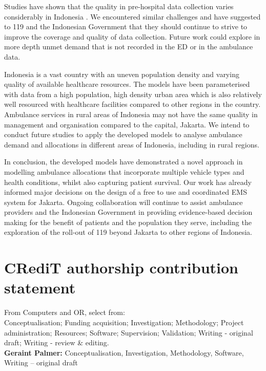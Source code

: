 \documentclass[preprint,12pt]{elsarticle}
\begin{document}
Studies have shown that the quality in pre-hospital data collection varies considerably in Indonesia \cite{hooper2019_datacollection}. We encountered similar challenges and have suggested to 119 and the Indonesian Government that they should continue to strive to improve the coverage and quality of data collection. Future work could explore in more depth unmet demand that is not recorded in the ED or in the ambulance data.

Indonesia is a vast country with an uneven population density and varying quality of available healthcare resources. The models have been parameterised with data from a high population, high density urban area which is also relatively well resourced with healthcare facilities compared to other regions in the country. Ambulance services in rural areas of Indonesia may not have the same quality in management and organisation compared to the capital, Jakarta. We intend to conduct future studies to apply the developed models to analyse ambulance demand and allocations in different areas of Indonesia, including in rural regions.

In conclusion, the developed models have demonstrated a novel approach in modelling ambulance allocations that incorporate multiple vehicle types and health conditions, whilst also capturing patient survival. Our work has already informed major decisions on the design of a free to use and coordinated EMS system for Jakarta. Ongoing collaboration will continue to assist ambulance providers and the Indonesian Government in providing evidence-based decision making for the benefit of patients and the population they serve, including the exploration of the roll-out of 119 beyond Jakarta to other regions of Indonesia. 

\section*{CRediT authorship contribution statement}

From Computers and OR, select from:\\

Conceptualisation; Funding acquisition; Investigation; Methodology; Project administration; Resources; Software; Supervision; Validation; Writing - original draft; Writing - review \& editing.\\


{\bf Geraint Palmer:} Conceptualisation, Investigation, Methodology, Software, Writing – original draft\\
\end{document}
